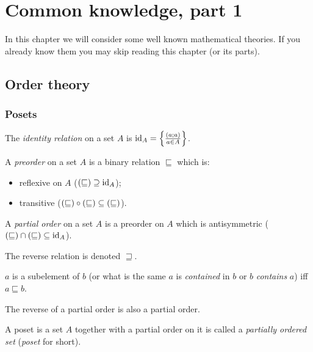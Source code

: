 
\chapter{\label{chap-common}Common knowledge, part 1}

In this chapter we will consider some well known mathematical theories.
If you already know them you may skip reading this chapter (or its
parts).


\section{Order theory}


\subsection{Posets}
\begin{defn}
The \emph{identity relation} on a set $A$
is $\operatorname{id}_{A}=\left\{ \frac{(a;a)}{a\in A}\right\}$.
\end{defn}

\begin{defn}
A \emph{preorder} on a set $A$ is a binary relation
$\sqsubseteq$ which is:
\begin{itemize}
\item reflexive on $A$ ($\left(\mathord{\sqsubseteq}\right)\supseteq\operatorname{id}_{A}$);
\item transitive ($\left(\mathord{\sqsubseteq}\right)\circ\left(\mathord{\sqsubseteq}\right)\subseteq\left(\mathord{\sqsubseteq}\right)$).
\end{itemize}
\end{defn}

\begin{defn}
A \emph{partial order} on a set $A$ is a preorder
on $A$ which is antisymmetric ($\left(\mathord{\sqsubseteq}\right)\cap\left(\mathord{\sqsubseteq}\right)\subseteq\operatorname{id}_A$).
\end{defn}
The reverse relation is denoted $\sqsupseteq$.
\begin{defn}
$a$ is a subelement of $b$ (or what is the same
$a$ is \emph{contained} in $b$ or $b$ \emph{contains} $a$) iff
$a\sqsubseteq b$.\end{defn}
\begin{obvious}
The reverse of a partial order is also a partial order.\end{obvious}
\begin{defn}
A poset is a set $A$ together with
a partial order on it is called a \emph{partially ordered set} (\emph{poset}
for short).
\end{defn}

